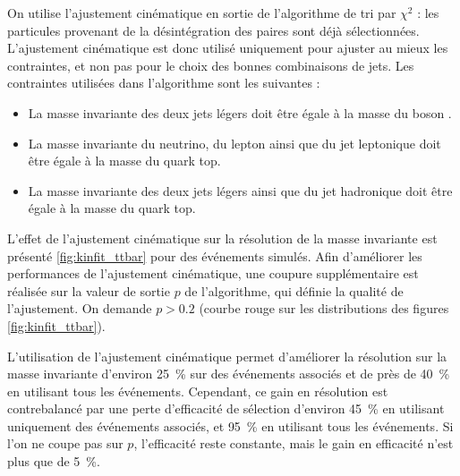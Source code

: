 On utilise l'ajustement cinématique en sortie de l'algorithme de tri par $\chi^2$ : les particules provenant de la désintégration des paires \ttbar sont déjà sélectionnées. L'ajustement cinématique est donc utilisé uniquement pour ajuster au mieux les contraintes, et non pas pour le choix des bonnes combinaisons de jets. Les contraintes utilisées dans l'algorithme sont les suivantes :
\begin{itemize}
    \item La masse invariante des deux jets légers doit être égale à la masse du boson \PW.
    \item La masse invariante du neutrino, du lepton ainsi que du jet \Pbottom leptonique doit être égale à la masse du quark top.
    \item La masse invariante des deux jets légers ainsi que du jet \Pbottom hadronique doit être égale à la masse du quark top.
\end{itemize}

L'effet de l'ajustement cinématique sur la résolution de la masse invariante est présenté \cref{fig:kinfit_ttbar} pour des événements \ttbar simulés. Afin d'améliorer les performances de l'ajustement cinématique, une coupure supplémentaire est réalisée sur la valeur de sortie $p$ de l'algorithme, qui définie la qualité de l'ajustement. On demande $p > 0.2$ (courbe \textcolor{rouge_grandmere}{rouge} sur les distributions des figures \ref{fig:kinfit_ttbar}).



\bigskip

L'utilisation de l'ajustement cinématique permet d'améliorer la résolution sur la masse invariante d'environ \SI{25}{\%} sur des événements associés et de près de \SI{40}{\%} en utilisant tous les événements. Cependant, ce gain en résolution est contrebalancé par une perte d'efficacité de sélection d'environ \SI{45}{\%} en utilisant uniquement des événements associés, et \tilde\SI{95}{\%} en utilisant tous les événements. Si l'on ne coupe pas sur $p$, l'efficacité reste constante, mais le gain en efficacité n'est plus que de \tilde\SI{5}{\%}.

